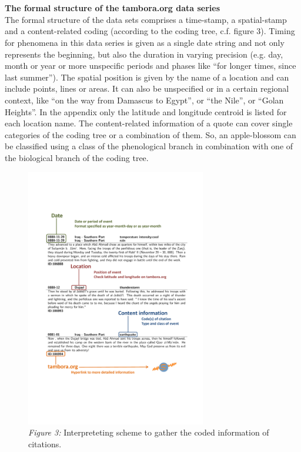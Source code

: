 \\\\
\textbf{The formal structure of the tambora.org data series}
\vspace{0.25cm}\\
The formal structure of the data sets comprises a time-stamp, a spatial-stamp and a content-related coding (according to the coding tree, c.f. figure 3). Timing for phenomena in this data series is given as a single date string and not only represents the beginning, but also the duration in varying precision (e.g. day, month or year or more unspecific periods and phases like “for longer times, since last summer”). The spatial position is given by the name of a location and can include points, lines or areas. It can also be unspecified or in a certain regional context, like “on the way from Damascus to Egypt”, or “the Nile”, or “Golan Heights”. In the appendix only the latitude and longitude centroid is listed for each location name. The content-related information of a quote can cover single categories of the coding tree or a combination of them.  So, an apple-blossom can be classified using a class of the phenological branch in combination with one of the biological branch of the coding tree.
\begin{figure}[H]
	\begin{center}
 \includegraphics[width=0.7\textwidth]{fig/notes/description.pdf}
 \caption*{\textit{Figure 3:} Interpreteting scheme to gather the coded information of citations.}
 \end{center}
\end{figure}
